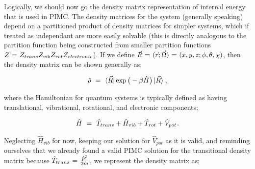 \documentclass{article}
\begin{document}
Logically, we should now go the density matrix representation of internal energy that is used in PIMC. The density matrices for the system (generally speaking) depend on a partitioned product of density matrices for simpler systems, which if treated as independant are more easily solvable (this is directly analogous to the partition function being constructed from smaller partition functions \begin{math} Z \hspace{0.025cm} = \hspace{0.025cm} Z_{trans} Z_{vib} Z_{rot} Z_{electronic} \end{math}). If we define \begin{math} \vec{R} \hspace{0.025cm} = \hspace{0.025cm} (\vec{r};\vec{\Omega})  \hspace{0.025cm} = \hspace{0.025cm} (x,y,z;\phi,\theta,\chi) \end{math}, then the density matrix can be shown generally as;

\begin{equation} \label{eb-eq-1-218}
\hat{\rho} \hspace{0.125cm} = \hspace{0.125cm} \bra{\vec{R}} \exp \big( - \beta \hat{H} \big) \ket{\vec{R}} \hspace{0.025cm} , 
\end{equation}

where the Hamiltonian for quantum systems is typically defined as having translational, vibrational, rotational, and electronic components;

\begin{equation} \label{eb-eq-1-219}
\hat{H} \hspace{0.125cm} = \hspace{0.125cm} \hat{T}_{trans} + \hat{H}_{vib} + \hat{T}_{rot} + \hat{V}_{pot} \hspace{0.025cm} .
\end{equation}

Neglecting \begin{math} \hat{H}_{vib} \end{math} for now, keeping our solution for \begin{math} \hat{V}_{pot} \end{math} as it is valid, and reminding ourselves that we already found a valid PIMC solution for the transitional density matrix because \begin{math} \hat{T}_{trans} \hspace{0.025cm} = \hspace{0.025cm} \frac{\hat{p}^2}{2 m} \end{math}, we represent the density matrix as;
\end{document}
